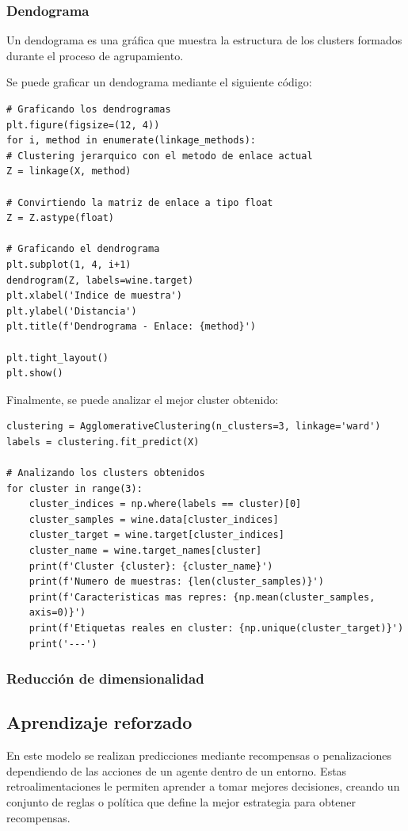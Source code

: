 \documentclass[a4paper, 12pt]{book}
\begin{document}
\subsubsection{Dendograma}
Un dendograma es una gráfica que muestra la estructura de los clusters formados durante el proceso de agrupamiento.

Se puede graficar un dendograma mediante el siguiente código:
\begin{verbatim}
# Graficando los dendrogramas
plt.figure(figsize=(12, 4))
for i, method in enumerate(linkage_methods):
# Clustering jerarquico con el metodo de enlace actual
Z = linkage(X, method)

# Convirtiendo la matriz de enlace a tipo float
Z = Z.astype(float)

# Graficando el dendrograma
plt.subplot(1, 4, i+1)
dendrogram(Z, labels=wine.target)
plt.xlabel('Indice de muestra')
plt.ylabel('Distancia')
plt.title(f'Dendrograma - Enlace: {method}')

plt.tight_layout()
plt.show()
\end{verbatim}

Finalmente, se puede analizar el mejor cluster obtenido:
\begin{verbatim}
clustering = AgglomerativeClustering(n_clusters=3, linkage='ward')
labels = clustering.fit_predict(X)

# Analizando los clusters obtenidos
for cluster in range(3):
	cluster_indices = np.where(labels == cluster)[0]
	cluster_samples = wine.data[cluster_indices]
	cluster_target = wine.target[cluster_indices]
	cluster_name = wine.target_names[cluster]
	print(f'Cluster {cluster}: {cluster_name}')
	print(f'Numero de muestras: {len(cluster_samples)}')
	print(f'Caracteristicas mas repres: {np.mean(cluster_samples,
	axis=0)}')
	print(f'Etiquetas reales en cluster: {np.unique(cluster_target)}')
	print('---')
\end{verbatim}
\subsubsection{Reducción de dimensionalidad}



\subsection{Aprendizaje reforzado}
En este modelo se realizan predicciones mediante recompensas o penalizaciones dependiendo de las acciones de un agente dentro de un entorno. Estas retroalimentaciones le permiten aprender a tomar mejores decisiones, creando un conjunto de reglas o política que define la mejor estrategia para obtener recompensas.
\end{document}
